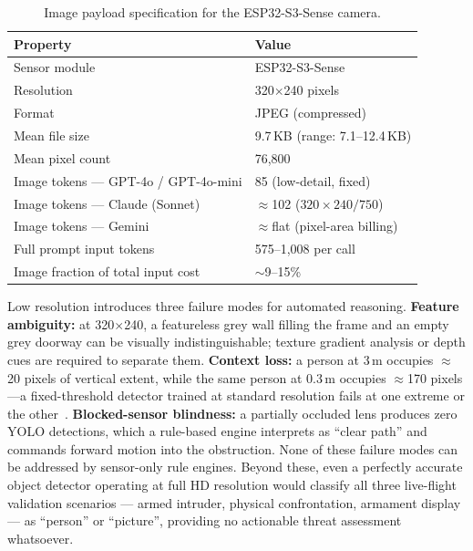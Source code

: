 \documentclass[journal]{IEEEtran}
\begin{document}
\begin{table}[!t]
  \caption{Image payload specification for the ESP32-S3-Sense camera.}
  \label{tab:image_spec}
  \centering
  \small
  \begin{tabular}{ll}
    \toprule
    Property & Value \\
    \midrule
    Sensor module        & ESP32-S3-Sense \\
    Resolution           & 320$\times$240 pixels \\
    Format               & JPEG (compressed) \\
    Mean file size       & 9.7\,KB (range: 7.1--12.4\,KB) \\
    Mean pixel count     & 76,800 \\
    \midrule
    Image tokens --- GPT-4o / GPT-4o-mini & 85 (low-detail, fixed) \\
    Image tokens --- Claude (Sonnet)      & $\approx$102 ($320\!\times\!240/750$) \\
    Image tokens --- Gemini               & $\approx$flat (pixel-area billing) \\
    \midrule
    Full prompt input tokens              & 575--1,008 per call \\
    Image fraction of total input cost    & $\sim$9--15\% \\
    \bottomrule
  \end{tabular}
\end{table}

Low resolution introduces three failure modes for automated reasoning.
\textbf{Feature ambiguity:} at 320$\times$240, a featureless grey wall
filling the frame and an empty grey doorway can be visually indistinguishable;
texture gradient analysis or depth cues are required to separate them.
\textbf{Context loss:} a person at 3\,m occupies $\approx$20 pixels of
vertical extent, while the same person at 0.3\,m occupies $\approx$170
pixels---a fixed-threshold detector trained at standard resolution fails
at one extreme or the other~\cite{kim2024yoloihd}.
\textbf{Blocked-sensor blindness:} a partially occluded lens produces zero
YOLO detections, which a rule-based engine interprets as ``clear path''
and commands forward motion into the obstruction.
None of these failure modes can be addressed by sensor-only rule engines.
Beyond these, even a perfectly accurate object detector operating at full HD
resolution would classify all three live-flight validation scenarios ---
armed intruder, physical confrontation, armament display --- as ``person''
or ``picture'', providing no actionable threat assessment whatsoever.
\end{document}
